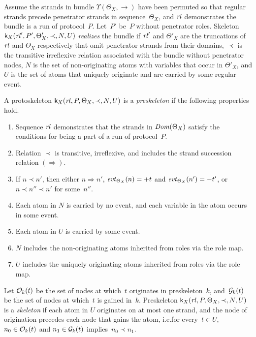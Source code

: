 \documentclass[12pt]{report}
\theoremstyle{definition}
\newcommand{\sdom}{\fn{Dom}}
\newcommand{\evt}{\fn{evt}}
\newcommand{\skel}{\mathsf{k}}
\newcommand{\rl}{\fn{rl}}
\begin{document}
Assume the strands in bundle $\Upsilon(\Theta_X,\to)$ have been
permuted so that regular strands precede penetrator strands in
sequence~$\Theta_X$, and $\rl$ demonstrates the bundle is a run of
protocol~$P$.  Let~$P'$ be~$P$ without penetrator roles.  Skeleton
$\skel_X(\rl',P',\Theta'_X,\prec,N,U)$ \emph{realizes} the bundle if
$\rl'$ and $\Theta'_X$ are the truncations of $\rl$ and $\Theta_X$
respectively that omit penetrator strands from their domains, $\prec$
is the transitive irreflexive relation associated with the bundle
without penetrator nodes, $N$ is the set of non-originating atoms with
variables that occur in $\Theta'_X$, and $U$ is the set of atoms that
uniquely originate and are carried by some regular event.

A protoskeleton $\skel_X(\rl,P,\Theta_X,\prec,N,U)$ is a
\emph{preskeleton} if the following properties hold.
\begin{enumerate}
\item Sequence $\rl$ demonstrates that the strands in $\sdom(\Theta_X)$
  satisfy the conditions for being a part of a run of protocol~$P$.
\item Relation $\prec$ is transitive, irreflexive, and includes the
  strand succession relation $(\Rightarrow)$.
\item If $n\prec n'$, then either $n\Rightarrow n'$,
  $\evt_{\Theta_X}(n)=\outbnd t$ and   $\evt_{\Theta_X}(n')=\inbnd
  t'$, or $n\prec n''\prec n'$ for some~$n''$.
\item Each atom in $N$ is carried by no event, and each variable
  in the atom occurs in some event.
\item Each atom in $U$ is carried by some event.
\item $N$ includes the non-originating atoms inherited from roles via
  the role map.
\item $U$ includes the uniquely originating atoms inherited from roles via
  the role map.
\end{enumerate}

\begin{sloppypar}
Let $\mathcal{O}_k(t)$ be the set of nodes at which~$t$ originates in
preskeleton~$k$, and~$\mathcal{G}_k(t)$ be the set of nodes at which~$t$ is
gained in~$k$.  Preskeleton $\skel_X(\rl,P,\Theta_X,\prec,N,U)$ is a
\emph{skeleton} if each atom in $U$ originates on at
most one strand, and the node of origination precedes each node that
gains the atom, i.e.\@ for every~$t\in U$, $n_0\in\mathcal{O}_k(t)$ and
$n_1\in\mathcal{G}_k(t)$ implies~$n_0\prec n_1$.
\end{sloppypar}
\end{document}
